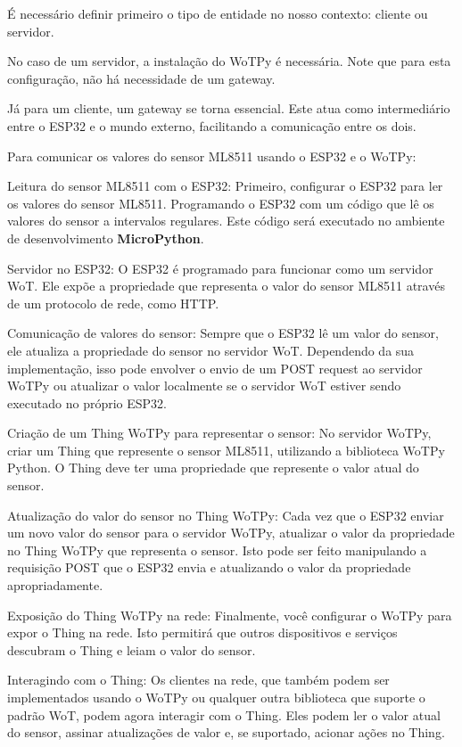É necessário definir primeiro o tipo de entidade no nosso contexto: cliente ou servidor.

No caso de um servidor, a instalação do WoTPy é necessária. Note que para esta configuração, não há necessidade de um gateway.

Já para um cliente, um gateway se torna essencial. Este atua como intermediário entre o ESP32 e o mundo externo, facilitando a comunicação entre os dois.

Para comunicar os valores do sensor ML8511 usando o ESP32 e o WoTPy:

Leitura do sensor ML8511 com o ESP32: Primeiro, configurar o ESP32 para ler os valores do sensor ML8511. Programando o ESP32 com um código que lê os valores do sensor a intervalos regulares. Este código será executado no ambiente de desenvolvimento \textbf{MicroPython}.

Servidor no ESP32: O ESP32 é programado para funcionar como um servidor WoT. Ele expõe a propriedade que representa o valor do sensor ML8511 através de um protocolo de rede, como HTTP.

Comunicação de valores do sensor: Sempre que o ESP32 lê um valor do sensor, ele atualiza a propriedade do sensor no servidor WoT. Dependendo da sua implementação, isso pode envolver o envio de um POST request ao servidor WoTPy ou atualizar o valor localmente se o servidor WoT estiver sendo executado no próprio ESP32.

Criação de um Thing WoTPy para representar o sensor: No servidor WoTPy, criar um Thing que represente o sensor ML8511, utilizando a biblioteca WoTPy Python. O Thing deve ter uma propriedade que represente o valor atual do sensor.

Atualização do valor do sensor no Thing WoTPy: Cada vez que o ESP32 enviar um novo valor do sensor para o servidor WoTPy, atualizar o valor da propriedade no Thing WoTPy que representa o sensor. Isto pode ser feito manipulando a requisição POST que o ESP32 envia e atualizando o valor da propriedade apropriadamente.

Exposição do Thing WoTPy na rede: Finalmente, você configurar o WoTPy para expor o Thing na rede. Isto permitirá que outros dispositivos e serviços descubram o Thing e leiam o valor do sensor.

Interagindo com o Thing: Os clientes na rede, que também podem ser implementados usando o WoTPy ou qualquer outra biblioteca que suporte o padrão WoT, podem agora interagir com o Thing. Eles podem ler o valor atual do sensor, assinar atualizações de valor e, se suportado, acionar ações no Thing.
